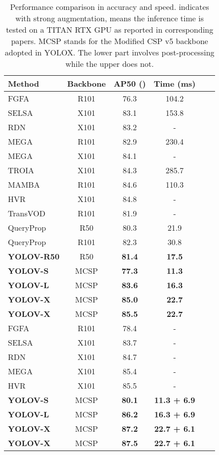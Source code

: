\documentclass[letterpaper]{article} \usepackage{aaai23}  \usepackage{times}  \usepackage{helvet}  \usepackage{courier}  \usepackage[hyphens]{url}  \usepackage{graphicx} \urlstyle{rm} \def\UrlFont{\rm}  \usepackage{natbib}  \usepackage{caption} \usepackage{xcolor}
\begin{document}
\setlength{\tabcolsep}{4pt}
\begin{table}[t]
\begin{center}
\begin{tabular}{l|ccccc}
\hline\noalign{\smallskip}
Method & Backbone  & AP50 () & Time (ms)  \\
\hline
\noalign{\smallskip}
FGFA & R101   & 76.3 & 104.2  \\
SELSA & X101   & 83.1 & 153.8  \\ 
RDN & X101   & 83.2 & -  \\
MEGA & R101   & 82.9 & 230.4  \\
MEGA & X101   & 84.1 & -  \\
TROIA & X101   & 84.3 & 285.7  \\
MAMBA & R101   & 84.6 & 110.3  \\
HVR & X101   & 84.8 & -  \\
TransVOD & R101   & 81.9 & -  \\
QueryProp & R50  & 80.3 & 21.9  \\
QueryProp & R101  & 82.3 & 30.8  \\
\hline
\noalign{\smallskip}
\textbf{YOLOV-R50} & R50    & \textbf{81.4} & \textbf{17.5}  \\
\textbf{YOLOV-S} & MCSP    & \textbf{77.3} & \textbf{11.3}  \\
\textbf{YOLOV-L} & MCSP    & \textbf{83.6} & \textbf{16.3}  \\
\textbf{YOLOV-X} & MCSP    & \textbf{85.0} & \textbf{22.7}  \\
\textbf{YOLOV-X} & MCSP   & \textbf{85.5} & \textbf{22.7}  \\
\hline
\hline
\noalign{\smallskip}
FGFA & R101   & 78.4 & - \\
SELSA & X101   & 83.7 & - \\
RDN & X101   & 84.7 & - \\
MEGA & X101   & 85.4 & - \\
HVR & X101   & 85.5 & -\\
\hline
\noalign{\smallskip}
\textbf{YOLOV-S} & MCSP    & \textbf{80.1} & \textbf{11.3 + 6.9} \\
\textbf{YOLOV-L}& MCSP    & \textbf{86.2} & \textbf{16.3 + 6.9}\\
\textbf{YOLOV-X}& MCSP    & \textbf{87.2} & \textbf{22.7 + 6.1}\\
\textbf{YOLOV-X} & MCSP   & \textbf{87.5} & \textbf{22.7 + 6.1}\\
\hline
\end{tabular}
\end{center}
\caption{Performance comparison in accuracy and speed.  indicates with strong augmentation,  means the inference time is tested on a TITAN RTX GPU as reported in corresponding papers. MCSP stands for the Modified CSP v5 backbone adopted in YOLOX. The lower part involves post-processing while the upper does not.}
\label{table:compare w post}
\end{table}
\end{document}
